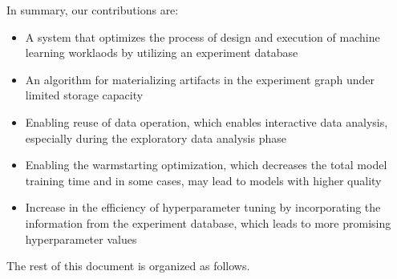 
In summary, our contributions are:
\begin{itemize}
\item A system that optimizes the process of design and execution of machine learning worklaods by utilizing an experiment database
\item An algorithm for materializing artifacts in the experiment graph under limited storage capacity
\item Enabling reuse of data operation, which enables interactive data analysis, especially during the exploratory data analysis phase
\item Enabling the warmstarting optimization, which decreases the total model training time and in some cases, may lead to models with higher quality
\item Increase in the efficiency of hyperparameter tuning by incorporating the information from the experiment database, which leads to more promising hyperparameter values
\end{itemize}

The rest of this document is organized as follows.